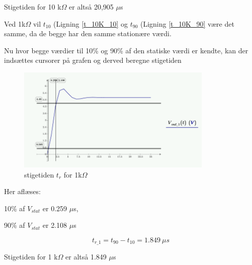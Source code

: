 Stigetiden for 10 k$\Omega$ er altså 20,905 $\mu$s

Ved 1k$\Omega$ vil $t_{10}$ (Ligning \ref{t_10K_10} og $t_{90}$ (Ligning \ref{t_10K_90} være det samme, da de begge har den samme stationære værdi.

Nu hvor begge værdier til 10\% og 90\% af den statiske værdi er kendte, kan der indsættes cursorer på grafen og derved beregne stigetiden

\begin{figure}[h]
 \begin{center}
  \includegraphics[height=5cm]{P_Fig/figur19_ana2st1K}
  \caption{stigetiden $t_r$ for 1k$\Omega$}
  \label{stigetid1K}
 \end{center}
\end{figure}

Her aflæses:
\begin{center}
\begin{minipage}{.2\linewidth}
10\% af $V_{stat}$ er 0.259 $\mu$s,
\end{minipage} 
\begin{minipage}{.2\linewidth}
90\% af $V_{stat}$ er 2.108 $\mu$s
\end{minipage} 
\end{center}

\begin{equation}
	t_{r\_1} = t_{90}-t_{10} = 1.849\ \mu s
\end{equation}

Stigetiden for 1 k$\Omega$ er altså 1.849 $\mu$s